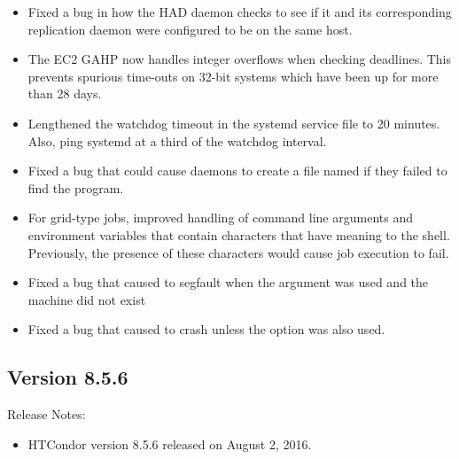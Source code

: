 \begin{itemize}

\item Fixed a bug in how the HAD daemon checks to see if it and its
corresponding replication daemon were configured to be on the same host.

\item The EC2 GAHP now handles integer overflows when checking deadlines.
This prevents spurious time-outs on 32-bit systems which have been up for
more than 28 days.

\item Lengthened the watchdog timeout in the systemd service file to 20 minutes.
Also, ping systemd at a third of the watchdog interval.

\item Fixed a bug that could cause daemons to create a file named
 if they failed to find the 
program.

\item For grid-type  jobs, improved handling of command
line arguments and environment variables that contain characters that
have meaning to the shell.
Previously, the presence of these characters would cause job execution
to fail.

\item Fixed a bug that caused  to segfault when the 
argument was used and the machine did not exist

\item Fixed a bug that caused   to crash unless the 
option was also used.

\end{itemize}

\subsection*{\label{sec:New-8-5-6}Version 8.5.6}

\noindent Release Notes:

\begin{itemize}

\item HTCondor version 8.5.6 released on August 2, 2016.

\end{itemize}


